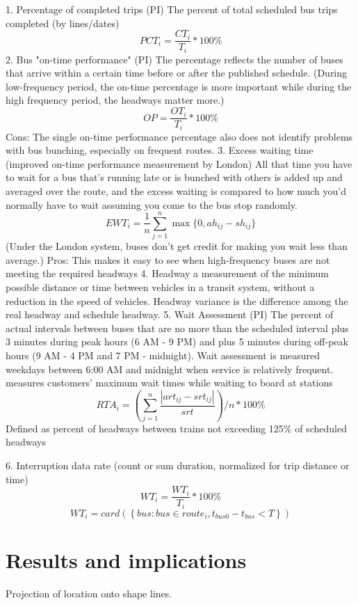 \documentclass[12pt,journal,compsoc]{IEEEtran}
\begin{document}
1.     Percentage of completed trips (PI)
The percent of total scheduled bus trips completed (by lines/dates)
$$PCT_i = \frac{CT_i}{T_i} * 100\%$$
2.     Bus "on-time performance" (PI)
The percentage reflects the number of buses that arrive within a certain time before or after the published schedule.
(During low-frequency period, the on-time percentage is more important while during the high frequency period, the headways matter more.)
$$OP  =  \frac{OT_i}{T_i} * 100\%$$
Cons:
The single on-time performance percentage also does not identify problems with bus bunching, especially on frequent routes.
3.     Excess waiting time (improved on-time performance measurement by London)
All that time you have to wait for a bus that's running late or is bunched with others is added up and averaged over the route, and the excess waiting is compared to how much you'd normally have to wait assuming you come to the bus stop randomly.
$$EWT_{i} = \frac{1}{n}  \sum_{j=1}^n \max \{  0,ah_{ij} - sh_{ij}    \}$$
(Under the London system, buses don't get credit for making you wait less than average.)
Pros: This makes it easy to see when high-frequency buses are not meeting the required headways
4.     Headway
a measurement of the minimum possible distance or time between vehicles in a transit system, without a reduction in the speed of vehicles.
Headway variance is the difference among the real headway and schedule headway.
5.     Wait Assessment (PI)
The percent of actual intervals between buses that are no more than the scheduled interval plus 3 minutes during peak hours (6 AM - 9 PM) and plus 5 minutes during off-peak hours (9 AM - 4 PM and 7 PM - midnight). Wait assessment is measured weekdays between 6:00 AM and midnight when service is relatively frequent.
measures customers’ maximum wait times while waiting to board at stations 
$$RTA_i = \left( \sum_{j=1}^n \frac{|art_{ij}-srt_{ij}|}{srt} \right)/n * 100\%$$
Defined as percent of headways between trains not exceeding 125$\%$ of scheduled headways 

6.     Interruption data rate (count or sum duration, normalized for trip distance or time)
$$WT_i = \frac{WT_i}{T_i} * 100\%$$
$$WT_i = card \left( \left\lbrace  bus:bus \in route_i ,  t_{bus0} - t_{bus} < T \right\rbrace \right)$$


\section{Results and implications}

Projection of location onto shape lines.
\end{document}
